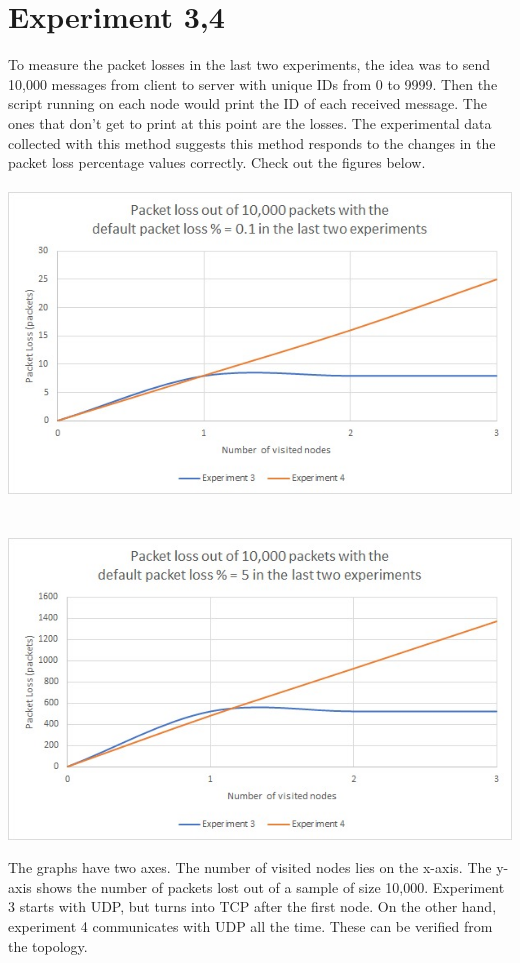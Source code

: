 \documentclass[12pt]{article}
\begin{document}
\section*{Experiment 3,4}
To measure the packet losses in the last two experiments, the idea was to send 10,000 messages from client to server with unique IDs from 0 to 9999. Then the script running on each node would print the ID of each received message. The ones that don't get to print at this point are the losses. The experimental data collected with this method suggests this method responds to the changes in the packet loss percentage values correctly. Check out the figures below.
\\\\
\includegraphics[scale=0.8]{graph2.jpg}
\\\\\\
\includegraphics[scale=0.8]{graph3.jpg}

The graphs have two axes. The number of visited nodes lies on the x-axis. The y-axis shows the number of packets lost out of a sample of size 10,000. Experiment 3 starts with UDP, but turns into TCP after the first node. On the other hand, experiment 4 communicates with UDP all the time. These can be verified from the topology.
\\
\end{document}
